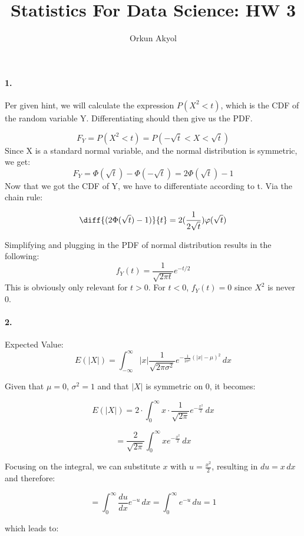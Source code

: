 \documentclass[10pt,letterpaper]{article}
\author{Orkun Akyol}
\title{Statistics For Data Science: HW 3}
\begin{document}
\paragraph{1.}
Per given hint, we will calculate the expression $P(X^2<t)$, which is the CDF of the random variable Y. Differentiating should then give us the PDF. 

    \begin{equation}
        F_Y = P(X^2 < t) = P(-\sqrt{t} < X < \sqrt{t})
    \end{equation}
Since X is a standard normal variable, and the normal distribution is symmetric, we get:  
    \begin{equation}
        F_Y = \Phi(\sqrt{t}) - \Phi(-\sqrt{t}) = 2\Phi(\sqrt{t}) - 1
    \end{equation}
Now that we got the CDF of Y, we have to differentiate according to t. Via the chain rule: 

    \begin{equation}
       \diff{(2\Phi(\sqrt{t})-1)}{t} = 2(\frac{1}{2\sqrt{t}})\varphi(\sqrt{t})
    \end{equation}

Simplifying and plugging in the PDF of normal distribution results in the following: 
    \begin{equation}
       f_Y(t) = \frac{1}{\sqrt{2\pi t}}e^{-t/2}
    \end{equation}
This is obviously only relevant for $t>0$. For $t<0$, $f_Y(t) = 0$ since $X^2$ is never $0$.
\paragraph{2.}
Expected Value:
\[
E(|X|) = \int_{-\infty}^{\infty} |x| \frac{1}{\sqrt{2 \pi \sigma^2}} e^{-\frac{1}{2 \sigma^2} (|x| - \mu)^2} \, dx
\]

Given that \( \mu = 0 \), \( \sigma^2 = 1 \) and that \( |X| \) is symmetric on \( 0 \), it becomes:

\[
E(|X|) = 2 \cdot \int_{0}^{\infty} x \cdot \frac{1}{\sqrt{2 \pi}} e^{-\frac{x^2}{2}} \, dx
\]

\[
= \frac{2}{\sqrt{2 \pi}} \int_{0}^{\infty} x e^{-\frac{x^2}{2}} \, dx
\]

Focusing on the integral, we can substitute \(x\) with \( u = \frac{x^2}{2} \), resulting in \(du = x\, dx\) and therefore:

\[
= \int_{0}^{\infty} \frac{du}{dx} e^{-u} \, dx = \int_{0}^{\infty} e^{-u} \, du = 1
\]

which leads to:
\end{document}
